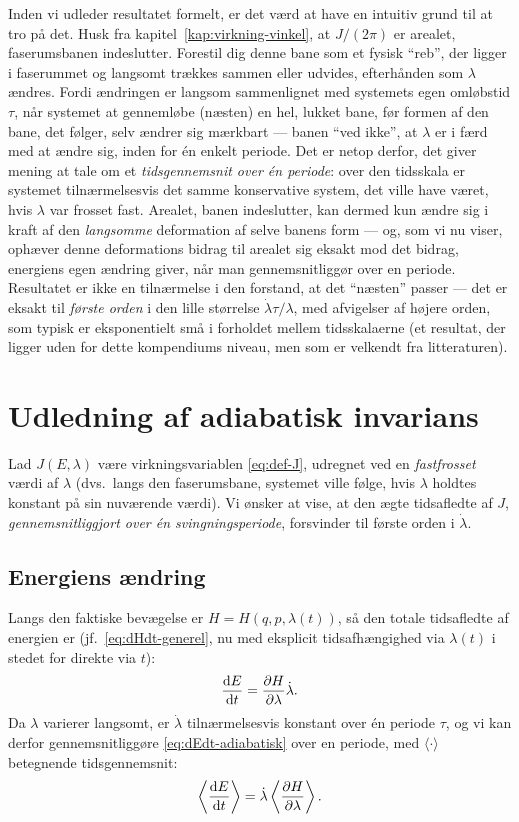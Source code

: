 Inden vi udleder resultatet formelt, er det værd at have en intuitiv
grund til at tro på det. Husk fra kapitel~\ref{kap:virkning-vinkel},
at $J/(2\pi)$ er arealet, faserumsbanen indeslutter. Forestil dig
denne bane som et fysisk ``reb'', der ligger i faserummet og langsomt
trækkes sammen eller udvides, efterhånden som $\lambda$ ændres. Fordi
ændringen er langsom sammenlignet med systemets egen omløbstid
$\tau$, når systemet at gennemløbe (næsten) en hel, lukket bane, før
formen af den bane, det følger, selv ændrer sig mærkbart — banen
``ved ikke'', at $\lambda$ er i færd med at ændre sig, inden for én
enkelt periode. Det er netop derfor, det giver mening at tale om et
\emph{tidsgennemsnit over én periode}: over den tidsskala er systemet
tilnærmelsesvis det samme konservative system, det ville have været,
hvis $\lambda$ var frosset fast. Arealet, banen indeslutter, kan
dermed kun ændre sig i kraft af den \emph{langsomme} deformation af
selve banens form — og, som vi nu viser, ophæver denne deformations
bidrag til arealet sig eksakt mod det bidrag, energiens egen ændring
giver, når man gennemsnitliggør over en periode. Resultatet er ikke
en tilnærmelse i den forstand, at det ``næsten'' passer — det er
eksakt til \emph{første orden} i den lille størrelse $\dot\lambda\tau/\lambda$,
med afvigelser af højere orden, som typisk er eksponentielt små i
forholdet mellem tidsskalaerne (et resultat, der ligger uden for dette
kompendiums niveau, men som er velkendt fra litteraturen).

\section{Udledning af adiabatisk invarians}

Lad $J(E,\lambda)$ være virkningsvariablen \eqref{eq:def-J}, udregnet
ved en \emph{fastfrosset} værdi af $\lambda$ (dvs.\ langs den
faserumsbane, systemet ville følge, hvis $\lambda$ holdtes konstant på
sin nuværende værdi). Vi ønsker at vise, at den ægte tidsafledte af
$J$, \emph{gennemsnitliggjort over én svingningsperiode}, forsvinder
til første orden i $\dot\lambda$.

\subsection{Energiens ændring}

Langs den faktiske bevægelse er $H=H(q,p,\lambda(t))$, så den totale
tidsafledte af energien er (jf.\ \eqref{eq:dHdt-generel}, nu med
eksplicit tidsafhængighed via $\lambda(t)$ i stedet for direkte via
$t$):
\begin{equation}
  \dv{E}{t} = \pdv{H}{\lambda}\dot\lambda.
  \label{eq:dEdt-adiabatisk}
\end{equation}
Da $\lambda$ varierer langsomt, er $\dot\lambda$ tilnærmelsesvis
konstant over én periode $\tau$, og vi kan derfor gennemsnitliggøre
\eqref{eq:dEdt-adiabatisk} over en periode, med $\langle\cdot\rangle$
betegnende tidsgennemsnit:
\begin{equation}
  \left\langle\dv{E}{t}\right\rangle = \dot\lambda\left\langle\pdv{H}{\lambda}\right\rangle.
  \label{eq:dEdt-gennemsnit}
\end{equation}

